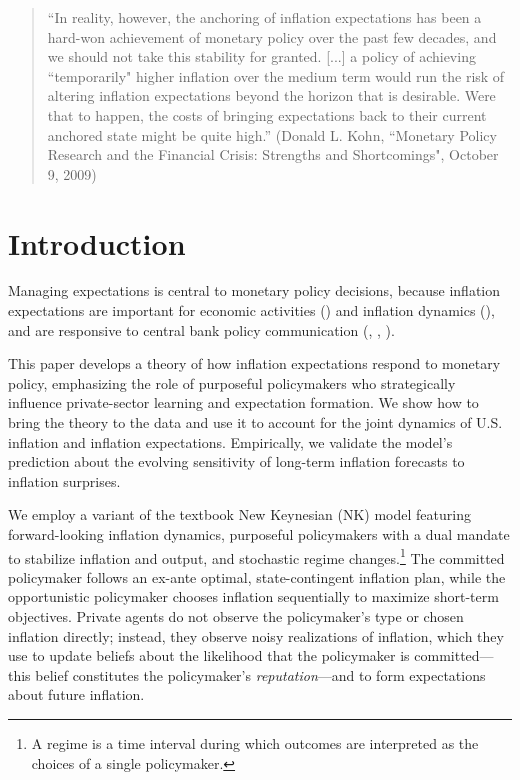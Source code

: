 \documentclass[12pt,letter,leqno]{article}
\theoremstyle{asn}
\theoremstyle{lem}
\theoremstyle{slem}
\theoremstyle{prop}
\theoremstyle{appprop}
\theoremstyle{rem}
\theoremstyle{defn}
\begin{document}
\baselineskip20pt 
\baselineskip17pt \thispagestyle{empty} 
\newpage \setcounter{page}{1}

\setcounter{page}{0}
\begin{nberonly}
\begin{quote}
{\color{webbrown} ``In reality, however, the anchoring of inflation
expectations has been a hard-won achievement of monetary policy over the
past few decades, and we should not take this stability for granted. [...] a
policy of achieving ``temporarily" higher inflation over the medium term
would run the risk of altering inflation expectations beyond the horizon
that is desirable. Were that to happen, the costs of bringing expectations
back to their current anchored state might be quite high.''}\newline
(Donald L. Kohn, ``Monetary Policy Research and the Financial Crisis:
Strengths and Shortcomings", October 9, 2009)
\end{quote}
\end{nberonly}

\newpage
\section{Introduction}
\setcounter{page}{1}

\baselineskip17pt

Managing expectations is central to monetary policy decisions, because inflation expectations are important for economic activities (\cite{coibion_how_2018}) and inflation dynamics (\cite{beaudry_dominant_2024}), and are responsive to central bank policy communication (\cite{hansen_first_2016}, \cite{haldane_central_2018}, \cite{blinder_central_2024}).


This paper develops a theory of how inflation expectations respond to monetary policy, emphasizing the role of purposeful policymakers who strategically influence private-sector learning and expectation formation. We show how to bring the theory to the data and use it to account for the joint dynamics of U.S. inflation and inflation expectations. Empirically, we validate the model’s prediction about the evolving sensitivity of long-term inflation forecasts to inflation surprises.

We employ a variant of the textbook New Keynesian (NK) model featuring forward-looking inflation dynamics, purposeful policymakers with a dual mandate to stabilize inflation and output, and stochastic regime changes.\footnote{A regime is a time interval during which outcomes are interpreted as the choices of a single policymaker.} The committed policymaker follows an ex-ante optimal, state-contingent inflation plan, while the opportunistic policymaker chooses inflation sequentially to maximize short-term objectives. Private agents do not observe the policymaker's type or chosen inflation directly; instead, they observe noisy realizations of inflation, which they use to update beliefs about the likelihood that the policymaker is committed—this belief constitutes the policymaker’s \textit{reputation}—and to form expectations about future inflation.  
\end{document}
